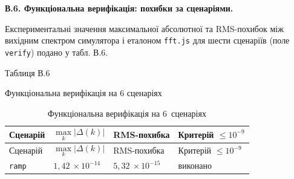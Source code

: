 \documentclass[
]{article}
\newcommand{\passthrough}[1]{#1}
\begin{document}
\textbf{В.6. Функціональна верифікація: похибки за сценаріями.}

Експериментальні значення максимальної абсолютної та RMS-похибок між
вихідним спектром симулятора і еталоном
\passthrough{\lstinline!fft!}\passthrough{\lstinline!.!}\passthrough{\lstinline!js!}
для шести сценаріїв (поле \passthrough{\lstinline!verify!}) подано у
табл. В.6.

Таблиця В.6

Функціональна верифікація на 6 сценаріях

\begin{longtable}[]{@{}
  >{\raggedright\arraybackslash}p{}
  >{\raggedright\arraybackslash}p{}
  >{\raggedright\arraybackslash}p{}
  >{\raggedright\arraybackslash}p{}@{}}
\caption[Функціональна верифікація на 6~сценаріях]{Функціональна
верифікація на 6~сценаріях}\tabularnewline
\toprule\noalign{}
\begin{minipage}[b]{\linewidth}\raggedright
Сценарій
\end{minipage} & \begin{minipage}[b]{\linewidth}\raggedright
\[\max_{k}|\Delta(k)|\]
\end{minipage} & \begin{minipage}[b]{\linewidth}\raggedright
RMS-похибка
\end{minipage} & \begin{minipage}[b]{\linewidth}\raggedright
Критерій \(\leq 10^{- 9}\)
\end{minipage} \\
\midrule\noalign{}
\endfirsthead
\toprule\noalign{}
\begin{minipage}[b]{\linewidth}\raggedright
Сценарій
\end{minipage} & \begin{minipage}[b]{\linewidth}\raggedright
\[\max_{k}|\Delta(k)|\]
\end{minipage} & \begin{minipage}[b]{\linewidth}\raggedright
RMS-похибка
\end{minipage} & \begin{minipage}[b]{\linewidth}\raggedright
Критерій \(\leq 10^{- 9}\)
\end{minipage} \\
\midrule\noalign{}
\endhead
\bottomrule\noalign{}
\endlastfoot
\passthrough{\lstinline!ramp!} & \({1,42\  \times 10}^{- 14}\) &
\({5,32\  \times 10}^{- 15}\) & виконано \\

\end{longtable}
\end{document}

